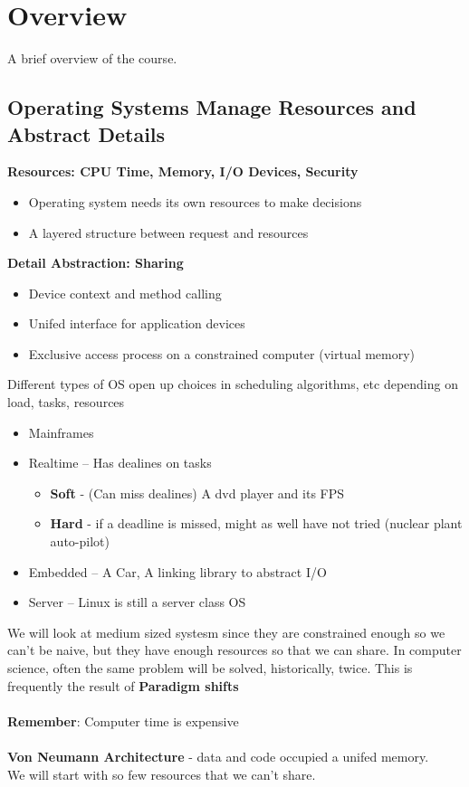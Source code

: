 \documentclass[../base_file/cs1550_notes.tex]{subfiles}
\begin{document}
\chapter{Overview}
A brief overview of the course.
\section{Operating Systems Manage Resources and Abstract Details}
\textbf{Resources: CPU Time, Memory, I/O Devices, Security}
	\begin{itemize}
	\item Operating system needs its own resources to make decisions
	\item A layered structure between request and resources
	\end{itemize}
\textbf{Detail Abstraction: Sharing}
	\begin{itemize}
	\item Device context and method calling
	\item Unifed interface for application devices
	\item Exclusive access  process on a constrained computer (virtual memory)
	\end{itemize}
Different types of OS open up choices in scheduling algorithms, etc depending on load, tasks, resources
	\begin{itemize}
	\item Mainframes
	\item Realtime -- Has dealines on tasks
		\begin{itemize}
		\item \textbf{Soft} - (Can miss dealines) A dvd player and its FPS
		\item \textbf{Hard} - if a deadline is missed, might as well have not tried (nuclear plant auto-pilot)
		\end{itemize}
	\item Embedded -- A Car, A linking library to abstract I/O
	\item Server -- Linux is still a server class OS
	\end{itemize}
We will look at medium sized systesm since they are constrained enough so we can't be naive, but they have enough resources so that we can share.
In computer science, often the same problem will be solved, historically, twice. This is frequently the result of \textbf{Paradigm shifts}\\\\ 
\textbf{Remember}: Computer time is expensive\\\\
\textbf{Von Neumann Architecture} - data and code occupied a unifed memory.\\
We will start with so few resources that we can't share.
\end{document}
